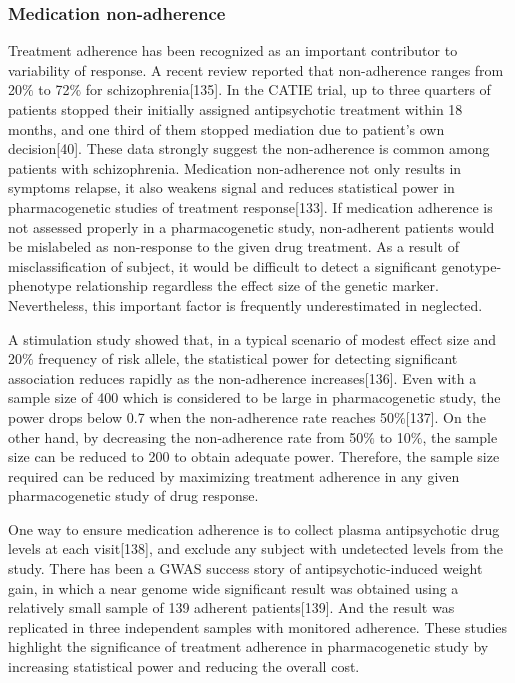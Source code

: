 \documentclass[12pt]{report}
\begin{document}
			\subsubsection{Medication non-adherence }
				Treatment adherence has been recognized as an important contributor to variability of response. 
				A recent review reported that non-adherence ranges from 20$\%$ to 72$\%$ for schizophrenia[135].
				In the CATIE trial, up to three quarters of patients stopped their initially assigned antipsychotic treatment within 18 months, and one third of them stopped mediation due to patient’s own decision[40].
				These data strongly suggest the non-adherence is common among patients with schizophrenia. 
				Medication non-adherence not only results in symptoms relapse, it also weakens signal and reduces statistical power in pharmacogenetic studies of treatment response[133]. 
				If medication adherence is not assessed properly in a pharmacogenetic study, non-adherent patients would be mislabeled as non-response to the given drug treatment. 
				As a result of misclassification of subject, it would be difficult to detect a significant genotype-phenotype relationship regardless the effect size of the genetic marker. 
				Nevertheless, this important factor is frequently underestimated in neglected. 
				
				A stimulation study showed that, in a typical scenario of modest effect size and 20$\%$ frequency of risk allele, the statistical power for detecting significant association reduces rapidly as the non-adherence increases[136]. 
				Even with a sample size of 400 which is considered to be large in pharmacogenetic study, the power drops below 0.7 when the non-adherence rate reaches 50$\%$[137].
				On the other hand, by decreasing the non-adherence rate from 50$\%$ to 10$\%$, the sample size can be reduced to 200 to obtain adequate power. 
				Therefore, the sample size required can be reduced by maximizing treatment adherence in any given pharmacogenetic study of drug response. 
				
				One way to ensure medication adherence is to collect plasma antipsychotic drug levels at each visit[138], and exclude any subject with undetected levels from the study. 
				There has been a GWAS success story of antipsychotic-induced weight gain, in which a near genome wide significant result was obtained using a relatively small sample of 139 adherent patients[139]. 
				And the result was replicated in three independent samples with monitored adherence. 
				These studies highlight the significance of treatment adherence in pharmacogenetic study by increasing statistical power and reducing the overall cost. 
\end{document}
